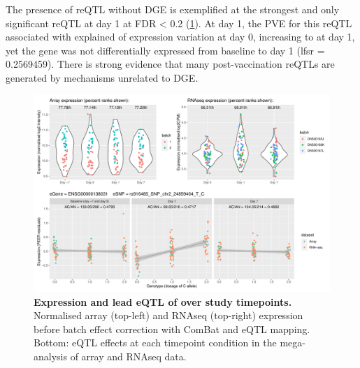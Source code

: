 The presence of \gls{reQTL} without \gls{DGE} is exemplified at the strongest and only significant \gls{reQTL} at day 1 at FDR < 0.2 (\cref{fig:hird_eQTL_ploteQTL_ADCY3}).
At day 1, the \gls{PVE} for this \gls{reQTL} associated with  explained  of expression variation at day 0, increasing to  at day 1,
yet the gene was not differentially expressed from baseline to day 1 (lfsr = \num{0.2569459}).
There is strong evidence that many post-vaccination \glspl{reQTL} are generated by mechanisms unrelated to \gls{DGE}.

\begin{figure}
    \centering
    \includegraphics[width=1.0\textwidth,page=1]{mainmatter/figures/chapter_03/plot_dge_eqtl_genotypes.ENSG00000138031,rs916485_SNP_chr2_24859404_T_C.pdf}
    \caption{
        \textbf{Expression and lead \gls{eQTL} of  over study timepoints.}
        Normalised array (top-left) and \gls{RNAseq} (top-right) expression before batch effect correction with ComBat and \gls{eQTL} mapping. 
        Bottom: \gls{eQTL} effects at each timepoint condition in the mega-analysis of array and \gls{RNAseq} data.
    }
    \label{fig:hird_eQTL_ploteQTL_ADCY3}
\end{figure}

